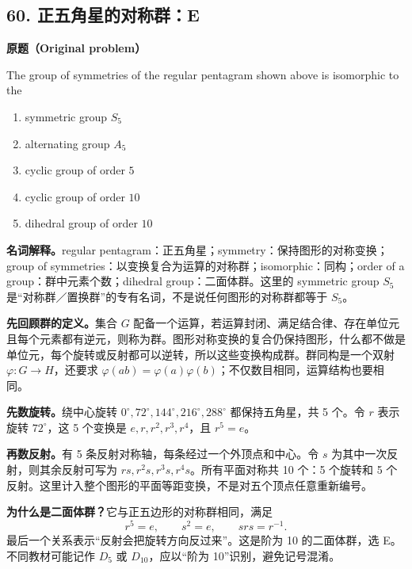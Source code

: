 \documentclass[11pt,a4paper,fontset=fandol]{ctexart}
\begin{document}
\subsection{60. 正五角星的对称群：E}
\label{p2:q60}
\textbf{原题（Original problem）}
\begin{center}
\end{center}
The group of symmetries of the regular pentagram shown above is isomorphic to the
\begin{enumerate}[label=(\Alph*)]
\item symmetric group $S_5$
\item alternating group $A_5$
\item cyclic group of order $5$
\item cyclic group of order $10$
\item dihedral group of order $10$
\end{enumerate}
\textbf{名词解释。}regular pentagram：正五角星；symmetry：保持图形的对称变换；group of symmetries：以变换复合为运算的对称群；isomorphic：同构；order of a group：群中元素个数；dihedral group：二面体群。这里的 symmetric group $S_5$ 是“对称群／置换群”的专有名词，不是说任何图形的对称群都等于 $S_5$。

\textbf{先回顾群的定义。}集合 $G$ 配备一个运算，若运算封闭、满足结合律、存在单位元且每个元素都有逆元，则称为群。图形对称变换的复合仍保持图形，什么都不做是单位元，每个旋转或反射都可以逆转，所以这些变换构成群。群同构是一个双射 $\varphi:G\to H$，还要求 $\varphi(ab)=\varphi(a)\varphi(b)$；不仅数目相同，运算结构也要相同。

\textbf{先数旋转。}绕中心旋转 $0^\circ,72^\circ,144^\circ,216^\circ,288^\circ$ 都保持五角星，共 5 个。令 $r$ 表示旋转 $72^\circ$，这 5 个变换是 $e,r,r^2,r^3,r^4$，且 $r^5=e$。

\textbf{再数反射。}有 5 条反射对称轴，每条经过一个外顶点和中心。令 $s$ 为其中一次反射，则其余反射可写为 $rs,r^2s,r^3s,r^4s$。所有平面对称共 10 个：5 个旋转和 5 个反射。这里计入整个图形的平面等距变换，不是对五个顶点任意重新编号。

\textbf{为什么是二面体群？}它与正五边形的对称群相同，满足
\[
r^5=e,\qquad s^2=e,\qquad srs=r^{-1}.
\]
最后一个关系表示“反射会把旋转方向反过来”。这是阶为 10 的二面体群，选 E。不同教材可能记作 $D_5$ 或 $D_{10}$，应以“阶为 10”识别，避免记号混淆。
\end{document}
